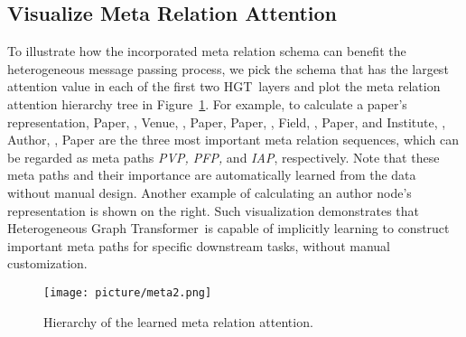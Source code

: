 \documentclass[sigconf]{acmart}
\theoremstyle{definition}
\newcommand{\model}{Heterogeneous Graph Transformer}
\newcommand{\short}{HGT}
\newcommand{\hide}[1]{} \newcommand{\vpara}[1]{\vspace{0.05in}\noindent\textbf{#1 }}
\begin{document}
\subsection{Visualize Meta Relation Attention}
To illustrate how the incorporated meta relation schema can benefit the heterogeneous message passing process, we pick the schema that has the largest attention value in each of the first two \short\ layers and plot the meta relation attention hierarchy tree in Figure~\ref{fig:meta}. 
For example, to calculate a paper's representation, 
Paper, , Venue, , Paper, 
Paper, , Field, , Paper, 
and Institute, , Author, , Paper
are the three most important meta relation sequences, which can be regarded as meta paths \textit{PVP, PFP,} and \textit{IAP}, respectively. 
Note that these meta paths and their importance are automatically learned from the data without manual design.  
Another example of calculating an author node's representation is shown on the right. 
Such visualization demonstrates that \model\ is capable of implicitly learning to construct important meta paths for specific downstream tasks, without manual customization.

\hide{
 \begin{figure}[t!]
    \centering
        \texttt{[image: picture/meta.png]}
    \caption{Hierarchy tree of learned meta relation attention.}
    \label{fig:meta}
\end{figure} 

}


 \begin{figure}[t!]
    \centering
        \texttt{[image: picture/meta2.png]}
    \caption{Hierarchy of the learned meta relation attention.}
    \label{fig:meta}
    \vspace{-0.3cm}
\end{figure} 
\end{document}
